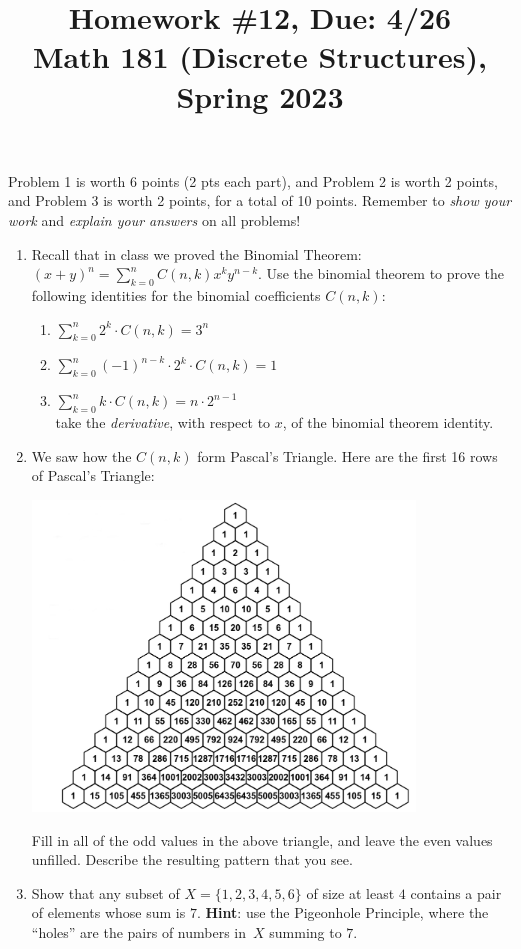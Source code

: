 \documentclass[11pt]{article}
\title{Homework \#12, Due: 4/26 \\Math 181 (Discrete Structures), Spring 2023}
\date{}
\begin{document}
\maketitle

\thispagestyle{empty}

\vspace{-1cm}

Problem 1 is worth 6 points (2 pts each part), and Problem 2 is worth 2 points, and Problem 3 is worth 2 points, for a total of 10 points. Remember to \emph{show your work} and \emph{explain your answers} on all problems!

\begin{enumerate}

\item Recall that in class we proved the Binomial Theorem: $(x+y)^n = \sum_{k=0}^{n} C(n,k) x^{k} y^{n-k}$. Use the binomial theorem to prove the following identities for the binomial coefficients $C(n,k)$:
\begin{enumerate}
\item $\sum_{k=0}^{n} 2^k \cdot C(n,k) = 3^n$
\item $\sum_{k=0}^{n} (-1)^{n-k} \cdot 2^k \cdot C(n,k) = 1$
\item $\sum_{k=0}^{n} k \cdot C(n,k) = n \cdot 2^{n-1}$ \\[5pt]  take the \emph{derivative}, with respect to $x$, of the binomial theorem identity.
\end{enumerate}

\item We saw how the $C(n,k)$ form Pascal's Triangle. Here are the first 16 rows of Pascal's Triangle:
\begin{center}
\includegraphics[width=4in]{pascal.png}
\end{center}
Fill in all of the odd values in the above triangle, and leave the even values unfilled. Describe the resulting pattern that you see.

\item Show that any subset of $X = \{1,2,3,4,5,6\}$ of size at least $4$ contains a pair of elements whose sum is $7$. {\bf Hint}: use the Pigeonhole Principle, where the ``holes'' are the pairs of numbers in~$X$ summing to $7$.

\end{enumerate}
\end{document}
